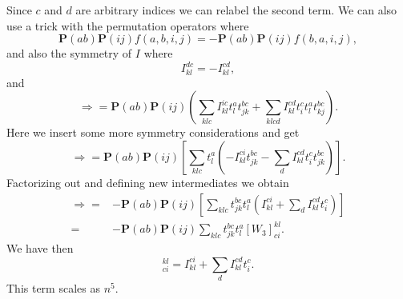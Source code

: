 \documentclass[a4paper,norsk,11pt,twoside]{report}
\begin{document}
Since $c$ and $d$ are arbitrary indices we can relabel the second term. We can also use a trick with the permutation operators where
\begin{equation}
\textbf{P}(ab) \textbf{P}(ij) f(a,b,i,j) = 
- \textbf{P}(ab) \textbf{P}(ij) f(b,a,i,j) ,
\end{equation}
and also the symmetry of $I$ where
\begin{equation}
I_{kl}^{dc} = - I_{kl}^{cd} ,
\end{equation}
and
\begin{equation}
\Rightarrow =
\textbf{P}(ab) \textbf{P}(ij) \left(
\sum_{klc} I_{kl}^{ic} t_l^a t_{jk}^{bc}
+ \sum_{klcd} I_{kl}^{cd} t_i^c t_l^a t_{kj}^{bc}
\right) .
\end{equation}
Here we insert some more symmetry considerations and get 
\begin{equation}
\Rightarrow =
\textbf{P}(ab) \textbf{P}(ij) \left[ \sum_{klc} t_l^a \left(
- I_{kl}^{ci} t_{jk}^{bc} - \sum_d I_{kl}^{cd} t_i^c t_{jk}^{bc} \right) \right] .
\end{equation}
Factorizing out and defining new intermediates we obtain
\begin{align}
\Rightarrow = &
- \textbf{P}(ab) \textbf{P}(ij) \left[ \sum_{klc} t_{jk}^{bc} t_l^a \left(
 I_{kl}^{ci} + \sum_d I_{kl}^{cd} t_i^c \right) \right] \nonumber \\
= &
- \textbf{P}(ab) \textbf{P}(ij) \sum_{klc}
t_{jk}^{bc} t_l^a
 [W_3]_{ci}^{kl} .
\end{align}
We have then
\begin{equation}
[W_3]_{ci}^{kl} = I_{kl}^{ci} + \sum_d I_{kl}^{cd} t_i^c  . \label{intermedW3}
\end{equation}
This term scales as $n^5$.
\end{document}
